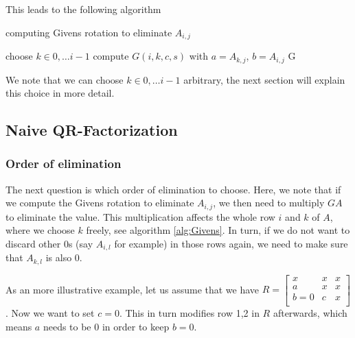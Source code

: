 \documentclass[a4paper]{scrartcl}
\begin{document}
            This leads to the following algorithm
            \begin{algorithm}[H]
                \caption{computing Givens rotation to eliminate $A_{i,j}$}\label{alg:Givens}
                \begin{algorithmic}[1]
                    \State choose $k \in {0, \dots i-1}$
                    \State compute $G(i,k,c,s)$ with $a=A_{k,j}$, $b=A_{i,j}$ 
                    \State \Return G
                \EndProcedure
                \end{algorithmic}
            \end{algorithm}
            We note that we can choose $k\in {0, \dots i-1}$ arbitrary, the next
            section will explain this choice in more detail.
    
    
    \subsection{Naive QR-Factorization}

        \subsubsection{Order of elimination}\label{sub:ElimOrder}
        
        The next question is which order of elimination to choose. Here, we note
        that if we compute the Givens rotation to eliminate $A_{i,j}$, we then need
        to multiply $GA$ to eliminate the value. This multiplication affects the
        whole row $i$ and $k$ of $A$, where we choose $k$ freely, see algorithm
        \ref{alg:Givens}. In turn, if we do not want to discard other 0s (say
        $A_{i,l}$ for example) in those rows again, we need to make sure that
        $A_{k,l}$ is also 0.

        As an more illustrative example, let us assume that we have
        $R= \begin{bmatrix}
            x & x & x \\
            a& x & x \\
            b=0 & c & x \\
        \end{bmatrix}$. Now we want to set $c=0$. This in turn modifies row 1,2 in
        $R$ afterwards, which means $a$ needs to be 0 in order to keep
        $b=0$.
\end{document}
